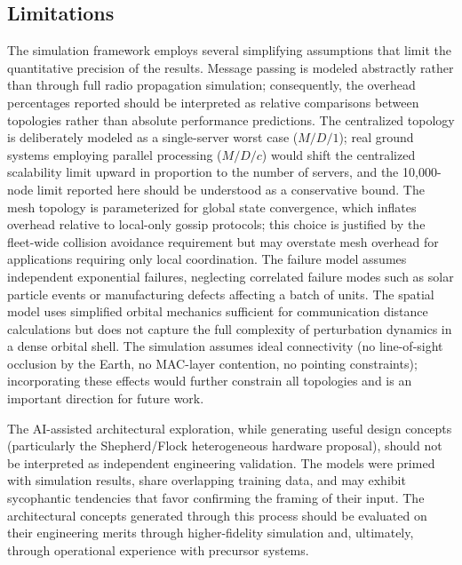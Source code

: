\documentclass[journal]{IEEEtran}
\begin{document}
\subsection{Limitations}

The simulation framework employs several simplifying assumptions that limit the quantitative precision of the results. Message passing is modeled abstractly rather than through full radio propagation simulation; consequently, the overhead percentages reported should be interpreted as relative comparisons between topologies rather than absolute performance predictions. The centralized topology is deliberately modeled as a single-server worst case ($M/D/1$); real ground systems employing parallel processing ($M/D/c$) would shift the centralized scalability limit upward in proportion to the number of servers, and the 10{,}000-node limit reported here should be understood as a conservative bound. The mesh topology is parameterized for global state convergence, which inflates overhead relative to local-only gossip protocols; this choice is justified by the fleet-wide collision avoidance requirement but may overstate mesh overhead for applications requiring only local coordination. The failure model assumes independent exponential failures, neglecting correlated failure modes such as solar particle events or manufacturing defects affecting a batch of units. The spatial model uses simplified orbital mechanics sufficient for communication distance calculations but does not capture the full complexity of perturbation dynamics in a dense orbital shell. The simulation assumes ideal connectivity (no line-of-sight occlusion by the Earth, no MAC-layer contention, no pointing constraints); incorporating these effects would further constrain all topologies and is an important direction for future work.

The AI-assisted architectural exploration, while generating useful design concepts (particularly the Shepherd/Flock heterogeneous hardware proposal), should not be interpreted as independent engineering validation. The models were primed with simulation results, share overlapping training data, and may exhibit sycophantic tendencies that favor confirming the framing of their input. The architectural concepts generated through this process should be evaluated on their engineering merits through higher-fidelity simulation and, ultimately, through operational experience with precursor systems.


\end{document}
